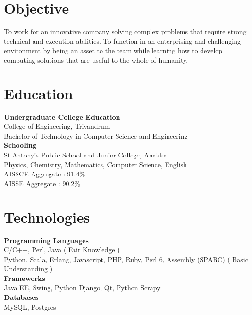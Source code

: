 \documentclass[line,margin]{res}
\begin{document}


\address{joji\_antony@gmx.com}
\address{+91 96323 41954}

\begin{resume}
\section{Objective}
To work for an innovative company solving complex problems that require strong technical and execution abilities. To function in an enterprising and challenging environment by being an asset to the team while learning how to develop computing solutions that are useful to the whole of humanity.\\

\section{Education}

{\bf Undergraduate College Education}\\
College of Engineering, Trivandrum\\
Bachelor of Technology in Computer Science and Engineering\\

{\bf Schooling} \\
St.Antony's Public School and Junior College, Anakkal\\
Physics, Chemistry, Mathematics, Computer Science, English\\

AISSCE Aggregate : 91.4\%\\
AISSE Aggregate : 90.2\%\\

\section{Technologies}

{\bf Programming Languages}\\
C/C++, Perl, Java ( Fair Knowledge )\\
Python, Scala, Erlang, Javascript, PHP, Ruby, Perl 6, Assembly (SPARC) ( Basic Understanding )\\

{\bf Frameworks}\\
Java EE, Swing, Python Django, Qt, Python Scrapy\\

{\bf Databases}\\
MySQL, Postgres\\


\end{resume}
\end{document}
